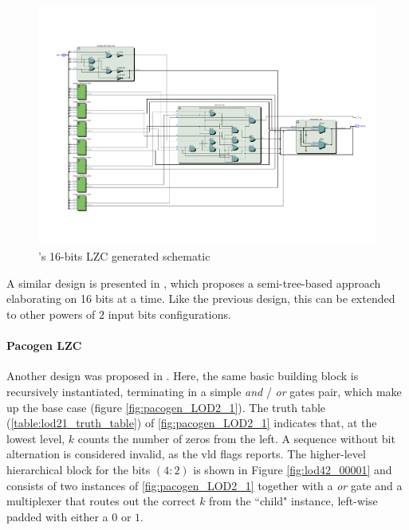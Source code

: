 \begin{figure}
    \centering
    \includegraphics[width=\textwidth]{figures/milenkovic_quartus2.pdf}
    \caption{\cite{milenkovic_modular_2015}'s 16-bits LZC generated schematic}
    \label{fig:milenkovic_lzc_quartus}
\end{figure}
A similar design is presented in \cite{dimitrakopoulos_low-power_2008}, which proposes a semi-tree-based approach elaborating on 16 bits at a time. Like the previous design, this can be extended to other powers of $2$ input bits configurations.

\paragraph{Pacogen LZC}

Another design was proposed in \cite{PACoGen}.
Here, the same basic building block is recursively instantiated, terminating in a simple \textit{and} / \textit{or} gates pair, which make up the base case (figure \ref{fig:pacogen_LOD2_1}).
The truth table (\ref{table:lod21_truth_table}) of \ref{fig:pacogen_LOD2_1} indicates that, at the lowest level, $k$ counts the number of zeros from the left. A sequence without bit alternation is considered invalid, as the $\text{vld}$ flags reports.
The higher-level hierarchical block for the bits $(4:2)$ is shown in Figure \ref{fig:lod42_00001} and consists of two instances of \ref{fig:pacogen_LOD2_1} together with a \textit{or} gate and a multiplexer that routes out the correct $k$ from the ``child" instance, left-wise padded with either a $0$ or $1$.

